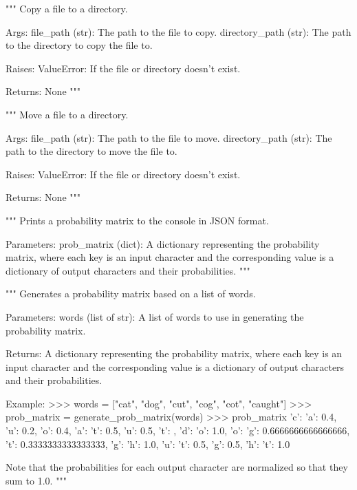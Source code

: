 \begin{codebox}
"""
Copy a file to a directory.

Args:
    file_path (str): The path to the file to copy.
    directory_path (str): The path to the directory to copy the file to.

Raises:
    ValueError: If the file or directory doesn't exist.

Returns:
    None
"""
\end{codebox}

\begin{codebox}
"""
Move a file to a directory.

Args:
    file_path (str): The path to the file to move.
    directory_path (str): The path to the directory to move the file to.

Raises:
    ValueError: If the file or directory doesn't exist.

Returns:
    None
"""
\end{codebox}

\begin{codebox}
"""
Prints a probability matrix to the console in JSON format.

Parameters:
    prob_matrix (dict): A dictionary representing the probability matrix,
    where each key is an input character and the corresponding value is a dictionary
    of output characters and their probabilities.
"""
\end{codebox}

\begin{codebox}
"""
Generates a probability matrix based on a list of words.

Parameters:
    words (list of str): A list of words to use in generating the probability matrix.

Returns:
    A dictionary representing the probability matrix, where each key is an input character
    and the corresponding value is a dictionary of output characters and their probabilities.

Example:
    >>> words = ["cat", "dog", "cut", "cog", "cot", "caught"]
    >>> prob_matrix = generate_prob_matrix(words)
    >>> prob_matrix
{
    'c': {'a': 0.4, 'u': 0.2, 'o': 0.4},
    'a': {'t': 0.5, 'u': 0.5},
    't': {},
    'd': {'o': 1.0},
    'o': {'g': 0.6666666666666666, 't': 0.3333333333333333},
    'g': {'h': 1.0},
    'u': {'t': 0.5, 'g': 0.5},
    'h': {'t': 1.0}
}

Note that the probabilities for each output character are normalized so that they sum to 1.0.
"""
\end{codebox}

